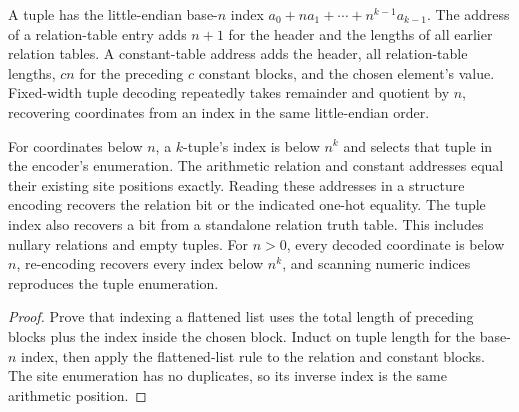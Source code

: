 \begin{definition}
  \label{def:desc-arithmetic-addresses}
  \leanok
  A tuple has the little-endian base-$n$ index
  $a_0+n a_1+\cdots+n^{k-1}a_{k-1}$. The address of a relation-table entry adds
  $n+1$ for the header and the lengths of all earlier relation tables. A
  constant-table address adds the header, all relation-table lengths, $cn$ for
  the preceding $c$ constant blocks, and the chosen element's value.
  Fixed-width tuple decoding repeatedly takes remainder and quotient by $n$,
  recovering coordinates from an index in the same little-endian order.
\end{definition}

\begin{theorem}
  \label{thm:desc-arithmetic-addresses}
  \leanok
  For coordinates below $n$, a $k$-tuple's index is below $n^k$ and selects that
  tuple in the encoder's enumeration. The arithmetic relation and constant
  addresses equal their existing site positions exactly. Reading these
  addresses in a structure encoding recovers the relation bit or the indicated
  one-hot equality. The tuple index also recovers a bit from a standalone
  relation truth table. This includes nullary relations and empty tuples.
  For $n>0$, every decoded coordinate is below $n$, re-encoding recovers every
  index below $n^k$, and scanning numeric indices reproduces the tuple enumeration.
\end{theorem}
\begin{proof}
  \leanok
  Prove that indexing a flattened list uses the total length of preceding
  blocks plus the index inside the chosen block. Induct on tuple length for
  the base-$n$ index, then apply the flattened-list rule to the relation and
  constant blocks. The site enumeration has no duplicates, so its inverse
  index is the same arithmetic position.
\end{proof}

